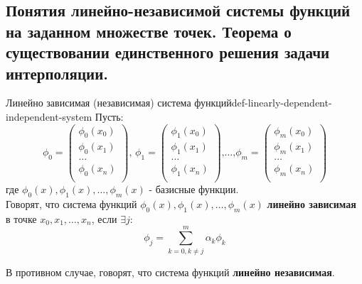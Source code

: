 \documentclass[14pt]{extarticle}
\begin{document}
\clearpage
\subsection{Понятия линейно-независимой системы функций на заданном множестве точек. Теорема о существовании единственного решения задачи интерполяции.}

    \begin{definition}{Линейно зависимая (независимая) система функций}{def-linearly-dependent-independent-system}
        Пусть:
        $$
        \phi_{0} = \begin{pmatrix} 
            \phi_{0}(x_{0})\\
            \phi_{0}(x_{1})\\
            \ldots\\
            \phi_{0}(x_{n})\\
        \end{pmatrix}
        \text{, }
        \phi_{1} = \begin{pmatrix} 
            \phi_{1}(x_{0})\\
            \phi_{1}(x_{1})\\
            \ldots\\
            \phi_{1}(x_{n})\\
        \end{pmatrix}
        \text{,}
        \ldots
        \text{,}
        \phi_{m} = \begin{pmatrix} 
            \phi_{m}(x_{0})\\
            \phi_{m}(x_{1})\\
            \ldots\\
            \phi_{m}(x_{n})\\
        \end{pmatrix}
        $$
        где $\phi_{0}(x), \phi_{1}(x), \ldots, \phi_{m}(x)$ - базисные функции.\\
    
        Говорят, что система функций $\phi_{0}(x), \phi_{1}(x), \ldots, \phi_{m}(x)$ \textbf{линейно зависимая} в точке $x_{0}, x_{1}, \ldots, x_{n}$, если $\exists j$:
        $$\phi_{j} = \sum_{k = 0, k \neq j}^{m} \alpha_{k}\phi_{k}$$
    
        В противном случае, говорят, что система функций \textbf{линейно независимая}.
    \end{definition}
\end{document}
